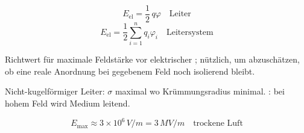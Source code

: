 \begin{formulabox}
\[ E_{\mathrm{el}} = \frac{1}{2}\,q\varphi \quad \text{Leiter} \]
\[ E_{\mathrm{el}} = \frac{1}{2}\sum_{i=1}^n q_i\varphi_i \quad \text{Leitersystem} \]
\end{formulabox}

\begin{runintext}
Richtwert für maximale Feldstärke vor elektrischer ; nützlich, um abzuschätzen, ob eine reale Anordnung bei gegebenem Feld noch isolierend bleibt.
\end{runintext}
\begin{runintext}
Nicht-kugelförmiger Leiter: $\sigma$ maximal wo Krümmungsradius minimal. : bei hohem Feld wird Medium leitend.
\end{runintext}
\begin{formulabox}
\[ E_{\max} \approx 3\times 10^6\,\si{V/m} = 3\,\si{MV/m} \quad \text{trockene Luft} \]
\end{formulabox}

